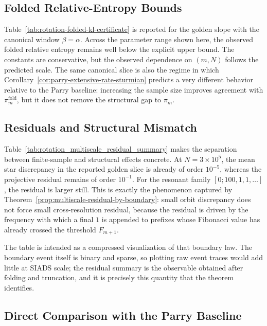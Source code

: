 \documentclass[11pt,letterpaper]{article}
\numberwithin{equation}{section}
\theoremstyle{plain}
\theoremstyle{definition}
\theoremstyle{remark}
\begin{document}
\subsection{Folded Relative-Entropy Bounds}



Table~\ref{tab:rotation-folded-kl-certificate} is reported for the golden slope
with the canonical window \(\beta=\alpha\). Across the parameter range shown
here, the observed folded relative entropy remains well below the explicit
upper bound. The constants are conservative, but the observed dependence on
\((m,N)\) follows the predicted scale. The same canonical slice is also the
regime in which Corollary~\ref{cor:parry-extensive-rate-sturmian} predicts a
very different behavior relative to the Parry baseline: increasing the sample
size improves agreement with \(\pi_m^{\mathrm{fold}}\), but it does not remove
the structural gap to \(\pi_m\).

\subsection{Residuals and Structural Mismatch}



Table~\ref{tab:rotation_multiscale_residual_summary} makes the separation
between finite-sample and structural effects concrete. At
\(N=3\times 10^5\), the mean star discrepancy in the reported golden slice is
already of order \(10^{-5}\), whereas the projective residual remains of order
\(10^{-1}\). For the resonant family \([0;100,1,1,\dots]\), the residual is
larger still. This is exactly the phenomenon captured by
Theorem~\ref{prop:multiscale-residual-by-boundary}: small orbit discrepancy
does not force small cross-resolution residual, because the residual is driven
by the frequency with which a final \(1\) is appended to prefixes whose
Fibonacci value has already crossed the threshold \(F_{m+1}\).

The table is intended as a compressed visualization of that boundary law. The
boundary event itself is binary and sparse, so plotting raw event traces would
add little at SIADS scale; the residual summary is the observable obtained after
folding and truncation, and it is precisely this quantity that the theorem
identifies.

\subsection{Direct Comparison with the Parry Baseline}
\end{document}
